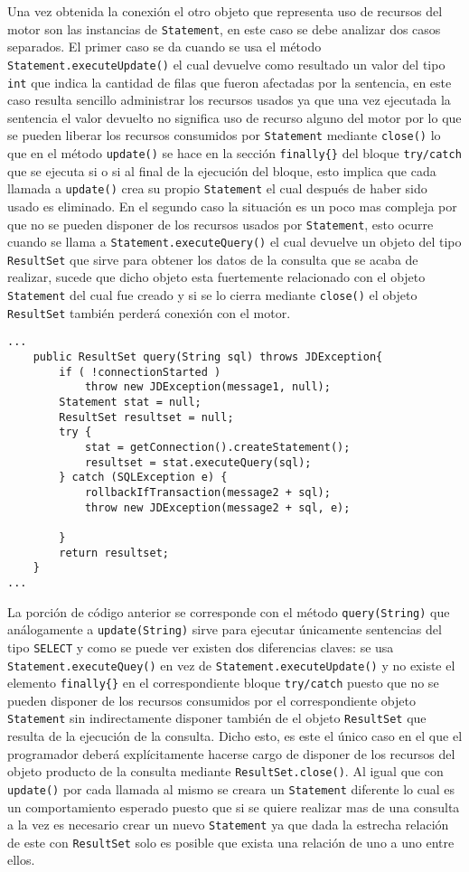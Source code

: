 Una vez obtenida la conexión el otro objeto que representa uso de recursos del motor son las instancias de \verb=Statement=, en este caso se debe analizar dos casos separados. El primer caso se da cuando se usa el método \verb=Statement.executeUpdate()= el cual devuelve como resultado un valor del tipo \verb=int= que indica la cantidad de filas que fueron afectadas por la sentencia, en este caso resulta sencillo administrar los recursos usados ya que una vez ejecutada la sentencia el valor devuelto no significa uso de recurso alguno del motor por lo que se pueden liberar los recursos consumidos por \verb=Statement= mediante \verb=close()= lo que en el método \verb=update()= se hace en la sección \verb=finally{}= del bloque \verb=try/catch= que se ejecuta si o si al final de la ejecución del bloque, esto implica que cada llamada a \verb=update()= crea su propio \verb=Statement= el cual después de haber sido usado es eliminado. En el segundo caso la situación es un poco mas compleja por que no se pueden disponer de los recursos usados por \verb=Statement=, esto ocurre cuando se llama a \verb=Statement.executeQuery()= el cual devuelve un objeto del tipo \verb=ResultSet= que sirve para obtener los datos de la consulta que se acaba de realizar, sucede que dicho objeto esta fuertemente relacionado con el objeto \verb=Statement= del cual fue creado y si se lo cierra mediante \verb=close()= el objeto \verb=ResultSet= también perderá conexión con el motor.
%
\begin{lstlisting}[title=función extraída de JDBCManager]
...
	public ResultSet query(String sql) throws JDException{
		if ( !connectionStarted ) 
			throw new JDException(message1, null);
		Statement stat = null;
		ResultSet resultset = null;
		try {
			stat = getConnection().createStatement();
			resultset = stat.executeQuery(sql);
		} catch (SQLException e) {
			rollbackIfTransaction(message2 + sql);
			throw new JDException(message2 + sql, e);

		}
		return resultset;
	}
...
\end{lstlisting}
%
La porción de código anterior se corresponde con el método \verb=query(String)= que análogamente a \verb=update(String)= sirve para ejecutar únicamente sentencias del tipo \verb=SELECT= y como se puede ver existen dos diferencias claves: se usa \verb=Statement.executeQuey()= en vez de \verb=Statement.executeUpdate()= y no existe el elemento \verb=finally{}= en el correspondiente bloque \verb=try/catch= puesto que no se pueden disponer de los recursos consumidos por el correspondiente objeto \verb=Statement= sin indirectamente disponer también de el objeto \verb=ResultSet= que resulta de la ejecución de la consulta. Dicho esto, es este el único caso en el que el programador deberá explícitamente hacerse cargo de disponer de los recursos del objeto producto de la consulta mediante \verb=ResultSet.close()=. Al igual que con \verb=update()= por cada llamada al mismo se creara un \verb=Statement= diferente lo cual es un comportamiento esperado puesto que si se quiere realizar mas de una consulta a la vez es necesario crear un nuevo \verb=Statement= ya que dada la estrecha relación de este con \verb=ResultSet= solo es posible que exista una relación de uno a uno entre ellos.

